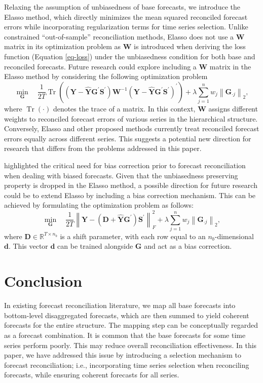 \documentclass[
  11pt]{article}
\theoremstyle{plain}
\theoremstyle{remark}
\begin{document}
Relaxing the assumption of unbiasedness of base forecasts, we introduce
the Elasso method, which directly minimizes the mean squared reconciled
forecast errors while incorporating regularization terms for time series
selection. Unlike constrained ``out-of-sample'' reconciliation methods,
Elasso does not use a \(\bm{W}\) matrix in its optimization problem as
\(\bm{W}\) is introduced when deriving the loss function (Equation
\eqref{eq-loss}) under the unbiasedness condition for both base and
reconciled forecasts. Future research could explore including a
\(\bm{W}\) matrix in the Elasso method by considering the following
optimization problem \[
\min_{\bm{G}} \quad \frac{1}{2 T} \operatorname{Tr}\left( \left(\bm{Y}-\hat{\bm{Y}} \bm{G}^{\prime} \bm{S}^{\prime}\right)\bm{W}^{-1}\left(\bm{Y}-\hat{\bm{Y}} \bm{G}^{\prime} \bm{S}^{\prime}\right)^{\prime}\right) + \lambda \sum_{j=1}^n w_j \left\|\bm{G}_{\cdot j}\right\|_2,
\] where \(\operatorname{Tr}(\cdot)\) denotes the trace of a matrix. In
this context, \(\bm{W}\) assigns different weights to reconciled
forecast errors of various series in the hierarchical structure.
Conversely, Elasso and other proposed methods currently treat reconciled
forecast errors equally across different series. This suggests a
potential new direction for research that differs from the problems
addressed in this paper.

\citet{Panagiotelis2021-mf} highlighted the critical need for bias
correction prior to forecast reconciliation when dealing with biased
forecasts. Given that the unbiasedness preserving property is dropped in
the Elasso method, a possible direction for future research could be to
extend Elasso by including a bias correction mechanism. This can be
achieved by formulating the optimization problem as follows: \[
\min_{\bm{G}} \quad \frac{1}{2 T} \left\|\bm{Y}-\left(\bm{D} + \hat{\bm{Y}} \bm{G}^{\prime}\right)\bm{S}^{\prime}\right\|_F^2 + \lambda \sum_{j=1}^n w_j \left\|\bm{G}_{\cdot j}\right\|_2,
\] where \(\bm{D} \in \mathbb{R}^{T \times n_b}\) is a shift parameter,
with each row equal to an \(n_b\)-dimensional \(\bm{d}\). This vector
\(\bm{d}\) can be trained alongside \(\bm{G}\) and act as a bias
correction.

\section{Conclusion}\label{sec-conclusion}


In existing forecast reconciliation literature, we map all base
forecasts into bottom-level disaggregated forecasts, which are then
summed to yield coherent forecasts for the entire structure. The mapping
step can be conceptually regarded as a forecast combination. It is
common that the base forecasts for some time series perform poorly. This
may reduce overall reconciliation effectiveness. In this paper, we have
addressed this issue by introducing a selection mechanism to forecast
reconciliation; i.e., incorporating time series selection when
reconciling forecasts, while ensuring coherent forecasts for all series.
\end{document}
